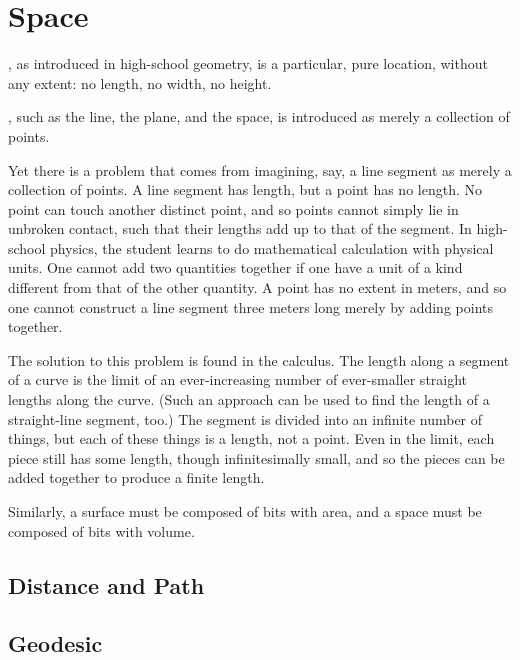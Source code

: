 \documentclass{tufte-book}
\begin{document}


\mainmatter

\chapter{Space}
\label{ch:space}

, as introduced in high-school geometry, is a particular,
pure location, without any extent: no length, no width, no height.

, such as the line, the plane, and the
space, is introduced as merely a collection of points.

\bigskip
Yet there is a problem that comes from imagining, say, a line segment as merely
a collection of points.  A line segment has length, but a point has no length.
No point can touch another distinct point, and so points cannot simply lie in
unbroken contact, such that their lengths add up to that of the segment.  In
high-school physics, the student learns to do mathematical calculation with
physical units.  One cannot add two quantities together if one have a unit of a
kind different from that of the other quantity.
A point has no extent in meters, and so one cannot construct a line segment
three meters long merely by adding points together.

The solution to this problem is found in the calculus.  The length along a
segment of a curve is the limit of an ever-increasing number of ever-smaller
straight lengths along the curve.  (Such an approach can be used to find the
length of a straight-line segment, too.)  The segment is divided into an
infinite number of things, but each of these things is a length, not a point.
Even in the limit, each piece still has some length, though infinitesimally
small, and so the pieces can be added together to produce a finite length.

Similarly, a surface must be composed of bits with area, and a space must be
composed of bits with volume.

\section{Distance and Path}

\section{Geodesic}

\appendix

\backmatter



%
%

\printindex
\end{document}
